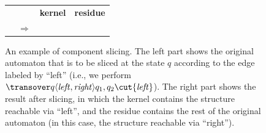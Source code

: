 {\begin{figure}[t]
  \centering
  \begin{tabular}{cccc}
    && \textbf{kernel} & \textbf{residue}\\
    \parbox{0.35\textwidth}{\centering} &
    $\Rightarrow$ &
    \parbox{0.2\textwidth}{\centering} &
    \parbox{0.2\textwidth}{\centering}
  \end{tabular}

  \caption{An example of component slicing. The left part shows the original
  automaton
  that is to be sliced at the state $q$ according to the edge labeled by ``left'' (i.e.,
  we perform
  $\transover q {\langle \mathit{left},\mathit{right} \rangle} {q_1,q_2} \cut \{\mathit{left}\}$).
  The
  right part shows the result after slicing, in which the kernel contains the structure
  reachable via ``left'', and the residue contains the rest of the original automaton
  (in this case, the structure reachable via ``right'').}

  \label{fig:slicing}

\end{figure}

}
